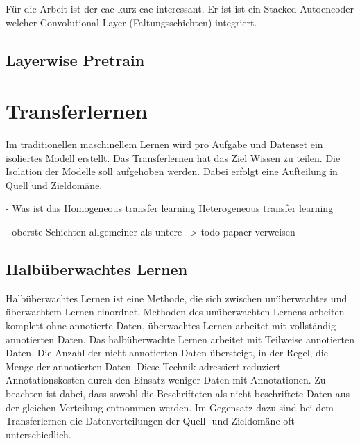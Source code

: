 	Für die Arbeit ist der \acl{cae} \cite{Masci.2011} kurz \ac{cae} interessant. Er ist ist ein Stacked Autoencoder welcher Convolutional Layer (Faltungsschichten) \cite{LeCun.1999} integriert.  

		\subsection{Layerwise Pretrain }

	\cite{Bengio.2007}

	\section{ Transferlernen}
	\label{sec:Transferlernen}
	Im traditionellen maschinellem Lernen wird pro Aufgabe und Datenset ein isoliertes Modell erstellt. Das Transferlernen hat das Ziel Wissen zu teilen. Die Isolation der Modelle soll aufgehoben werden. Dabei erfolgt eine Aufteilung in Quell und Zieldomäne.
	
		- Was ist das \cite{FuzhenZhuang.2019}
		Homogeneous transfer learning
	Heterogeneous transfer learning	
	
		-	oberste Schichten allgemeiner als untere --> todo papaer verweisen \cite{Tirumala.2018}	

		\subsection{Halbüberwachtes Lernen}
		Halbüberwachtes Lernen ist eine Methode, die sich zwischen unüberwachtes und überwachtem Lernen einordnet. Methoden des unüberwachten Lernens arbeiten komplett ohne annotierte Daten, überwachtes Lernen arbeitet mit vollständig annotierten Daten. Das halbüberwachte Lernen arbeitet mit Teilweise annotierten Daten. Die Anzahl der nicht annotierten Daten übersteigt, in der Regel, die Menge der annotierten Daten. Diese Technik adressiert reduziert Annotationskosten durch den Einsatz weniger Daten mit Annotationen. Zu beachten ist dabei, dass sowohl die Beschrifteten als nicht beschriftete Daten aus der gleichen Verteilung entnommen werden. 
		Im Gegensatz dazu sind bei dem Transferlernen die Datenverteilungen der Quell- und Zieldomäne oft unterschiedlich.
		\cite{Chapelle.2010} 
		
